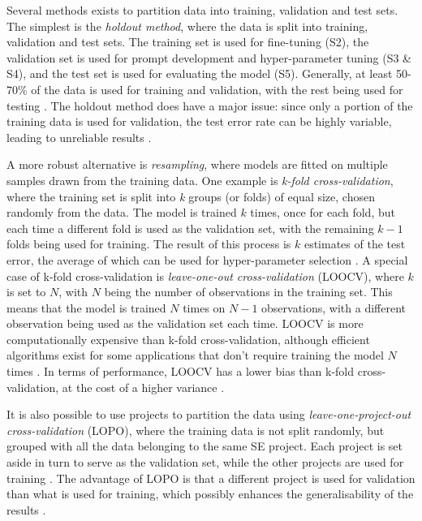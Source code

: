 \documentclass[a4paper]{article}
\begin{document}
Several methods exists to partition data into training, validation and test sets. The simplest is the \textit{holdout method}, where the data is split into training, validation and test sets. The training set is used for fine-tuning (S2), the validation set is used for prompt development and hyper-parameter tuning (S3 \& S4), and the test set is used for evaluating the model (S5). Generally, at least 50-70\% of the data is used for training and validation, with the rest being used for testing \cite{Bichri2024traintest,xu2018splitting}. The holdout method does have a major issue: since only a portion of the training data is used for validation, the test error rate can be highly variable, leading to unreliable results \cite{kim2009holdout,James2023isl5}. 

A more robust alternative is \textit{resampling}, where models are fitted on multiple samples drawn from the training data. One example is \textit{k-fold cross-validation}, where the training set is split into \textit{k} groups (or folds) of equal size, chosen randomly from the data. The model is trained $k$ times, once for each fold, but each time a different fold is used as the validation set, with the remaining $k-1$ folds being used for training. The result of this process is $k$ estimates of the test error, the average of which can be used for hyper-parameter selection \cite{James2023isl5}. A special case of k-fold cross-validation is \textit{leave-one-out cross-validation} (LOOCV), where $k$ is set to $N$, with $N$ being the number of observations in the training set. This means that the model is trained $N$ times on $N-1$ observations, with a different observation being used as the validation set each time. LOOCV is more computationally expensive than k-fold cross-validation, although efficient algorithms exist for some applications that don't require training the model $N$ times \cite{Cawley2003,wang2018approximateloocv}. In terms of performance, LOOCV has a lower bias than k-fold cross-validation, at the cost of a higher variance \cite{Cawley2003,Wong2015}.

It is also possible to use projects to partition the data using \textit{leave-one-project-out cross-validation} (LOPO), where the training data is not split randomly, but grouped with all the data belonging to the same SE project. Each project is set aside in turn to serve as the validation set, while the other projects are used for training \cite{Herbold2020,Dalpiaz2019}. The advantage of LOPO is that a different project is used for validation than what is used for training, which possibly enhances the generalisability of the results \cite{scikit-learn-cv2025}.
\end{document}

